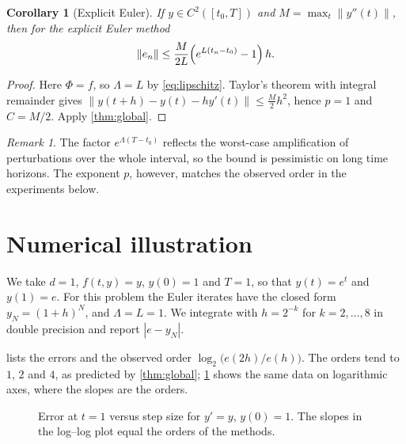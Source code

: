 \documentclass[a4paper,10pt,twocolumn]{article}
\theoremstyle{plain}
\newtheorem{corollary}{Corollary}
\theoremstyle{definition}
\theoremstyle{remark}
\newtheorem{remark}{Remark}
\newcommand{\norm}[1]{\lVert #1\rVert}
\begin{document}
\begin{corollary}[Explicit Euler]\label{cor:euler}
If $y\in C^2([t_0,T])$ and $M=\max_t\norm{y''(t)}$, then for the explicit Euler method
\[
  \norm{e_n}\le\frac{M}{2L}\Bigl(e^{L(t_n-t_0)}-1\Bigr)\,h .
\]
\end{corollary}

\begin{proof}
Here $\Phi=f$, so $\Lambda=L$ by \eqref{eq:lipschitz}. Taylor's theorem with integral remainder gives $\norm{y(t+h)-y(t)-hy'(t)}\le\frac{M}{2}h^2$, hence $p=1$ and $C=M/2$. Apply \cref{thm:global}.
\end{proof}

\begin{remark}
The factor $e^{\Lambda(T-t_0)}$ reflects the worst-case amplification of perturbations over the whole interval, so the bound is pessimistic on long time horizons. The exponent $p$, however, matches the observed order in the experiments below.
\end{remark}

\section{Numerical illustration}\label{sec:numerics}
We take $d=1$, $f(t,y)=y$, $y(0)=1$ and $T=1$, so that $y(t)=e^t$ and $y(1)=e$. For this problem the Euler iterates have the closed form $y_N=(1+h)^N$, and $\Lambda=L=1$. We integrate with $h=2^{-k}$ for $k=2,\dots,8$ in double precision and report $|e-y_N|$.

 lists the errors and the observed order $\log_2\bigl(e(2h)/e(h)\bigr)$. The orders tend to $1$, $2$ and $4$, as predicted by \cref{thm:global}; \cref{fig:convergence} shows the same data on logarithmic axes, where the slopes are the orders.

\begin{figure}[t]
  \centering
  \caption{Error at $t=1$ versus step size for $y'=y$, $y(0)=1$. The slopes in the log--log plot equal the orders of the methods.}\label{fig:convergence}
\end{figure}
\end{document}
